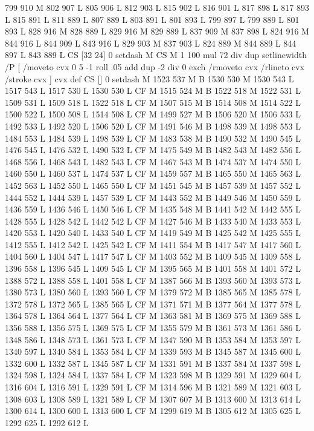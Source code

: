 {{{{{{{{{{{{{{{{{{{{{{{{799 910 M 802 907 L
805 906 L
812 903 L
815 902 L
816 901 L
817 898 L
817 893 L
815 891 L
811 889 L
807 889 L
803 891 L
801 893 L
799 897 L
799 889 L
801 893 L
828 916 M 828 889 L
829 916 M 829 889 L
837 909 M 837 898 L
824 916 M 844 916 L
844 909 L
843 916 L
829 903 M 837 903 L
824 889 M 844 889 L
844 897 L
843 889 L
CS [32 24] 0 setdash M
CS M 1 100 mul 72 div dup setlinewidth
/P [ /moveto cvx 0 5 -1 roll .05 add dup -2 div 0 exch /rmoveto cvx /rlineto cvx /stroke cvx ] cvx def
CS [] 0 setdash M
1523 537 M B
1530 530 M 1530 543 L
1517 543 L
1517 530 L
1530 530 L
CF M
1515 524 M B
1522 518 M 1522 531 L
1509 531 L
1509 518 L
1522 518 L
CF M
1507 515 M B
1514 508 M 1514 522 L
1500 522 L
1500 508 L
1514 508 L
CF M
1499 527 M B
1506 520 M 1506 533 L
1492 533 L
1492 520 L
1506 520 L
CF M
1491 546 M B
1498 539 M 1498 553 L
1484 553 L
1484 539 L
1498 539 L
CF M
1483 538 M B
1490 532 M 1490 545 L
1476 545 L
1476 532 L
1490 532 L
CF M
1475 549 M B
1482 543 M 1482 556 L
1468 556 L
1468 543 L
1482 543 L
CF M
1467 543 M B
1474 537 M 1474 550 L
1460 550 L
1460 537 L
1474 537 L
CF M
1459 557 M B
1465 550 M 1465 563 L
1452 563 L
1452 550 L
1465 550 L
CF M
1451 545 M B
1457 539 M 1457 552 L
1444 552 L
1444 539 L
1457 539 L
CF M
1443 552 M B
1449 546 M 1450 559 L
1436 559 L
1436 546 L
1450 546 L
CF M
1435 548 M B
1441 542 M 1442 555 L
1428 555 L
1428 542 L
1442 542 L
CF M
1427 546 M B
1433 540 M 1433 553 L
1420 553 L
1420 540 L
1433 540 L
CF M
1419 549 M B
1425 542 M 1425 555 L
1412 555 L
1412 542 L
1425 542 L
CF M
1411 554 M B
1417 547 M 1417 560 L
1404 560 L
1404 547 L
1417 547 L
CF M
1403 552 M B
1409 545 M 1409 558 L
1396 558 L
1396 545 L
1409 545 L
CF M
1395 565 M B
1401 558 M 1401 572 L
1388 572 L
1388 558 L
1401 558 L
CF M
1387 566 M B
1393 560 M 1393 573 L
1380 573 L
1380 560 L
1393 560 L
CF M
1379 572 M B
1385 565 M 1385 578 L
1372 578 L
1372 565 L
1385 565 L
CF M
1371 571 M B
1377 564 M 1377 578 L
1364 578 L
1364 564 L
1377 564 L
CF M
1363 581 M B
1369 575 M 1369 588 L
1356 588 L
1356 575 L
1369 575 L
CF M
1355 579 M B
1361 573 M 1361 586 L
1348 586 L
1348 573 L
1361 573 L
CF M
1347 590 M B
1353 584 M 1353 597 L
1340 597 L
1340 584 L
1353 584 L
CF M
1339 593 M B
1345 587 M 1345 600 L
1332 600 L
1332 587 L
1345 587 L
CF M
1331 591 M B
1337 584 M 1337 598 L
1324 598 L
1324 584 L
1337 584 L
CF M
1323 598 M B
1329 591 M 1329 604 L
1316 604 L
1316 591 L
1329 591 L
CF M
1314 596 M B
1321 589 M 1321 603 L
1308 603 L
1308 589 L
1321 589 L
CF M
1307 607 M B
1313 600 M 1313 614 L
1300 614 L
1300 600 L
1313 600 L
CF M
1299 619 M B
1305 612 M 1305 625 L
1292 625 L
1292 612 L
}}}}}}}}}}}}}}}}}}}}}}}}
